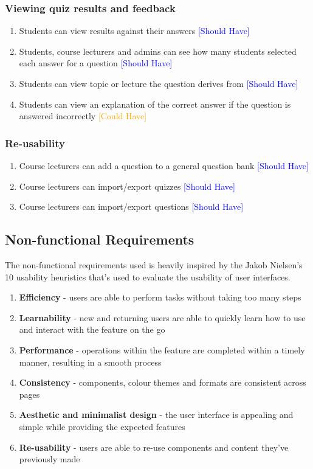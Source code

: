 \subsubsection{Viewing quiz results and feedback}
\begin{enumerate}
	\item Students can view results against their answers \textcolor{Blue}{[Should Have]}
	\item Students, course lecturers and admins can see how many students selected each answer for a question \textcolor{Blue}{[Should Have]}
	\item Students can view topic or lecture the question derives from \textcolor{Blue}{[Should Have]}
	\item Students can view an explanation of the correct answer if the question is answered incorrectly \textcolor{Orange}{[Could Have]}
\end{enumerate}

\subsubsection{Re-usability}
\begin{enumerate}
	\item Course lecturers can add a question to a general question bank \textcolor{Blue}{[Should Have]}
	\item Course lecturers can import/export quizzes \textcolor{Blue}{[Should Have]}
	\item Course lecturers can import/export questions \textcolor{Blue}{[Should Have]}
\end{enumerate}


\subsection{Non-functional Requirements}
The non-functional requirements used is heavily inspired by the Jakob Nielsen's 10 usability heuristics that's used to evaluate the usability of user interfaces. 

\begin{enumerate}
	\item \textbf{Efficiency} - users are able to perform tasks without taking too many steps
	\item \textbf{Learnability} - new and returning users are able to quickly learn how to use and interact with the feature on the go
	\item \textbf{Performance} - operations within the feature are completed within a timely manner, resulting in a smooth process
	\item \textbf{Consistency} - components, colour themes and formats are consistent across pages 
	\item \textbf{Aesthetic and minimalist design} - the user interface is appealing and simple while providing the expected features
	\item \textbf{Re-usability} - users are able to re-use components and content they've previously made
\end{enumerate}


